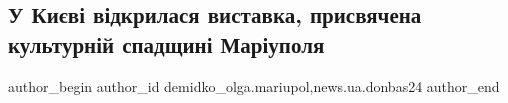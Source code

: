  
 
 
 
 
 
\subsection{У Києві відкрилася виставка, присвячена культурній спадщині Маріуполя}
\label{sec:19_04_2023.stz.news.ua.donbas24.1.kyiv_vystavka_kult_spadchyna_mrpl}
 
\ifcmt
 author_begin
   author_id demidko_olga.mariupol,news.ua.donbas24
 author_end
\fi
